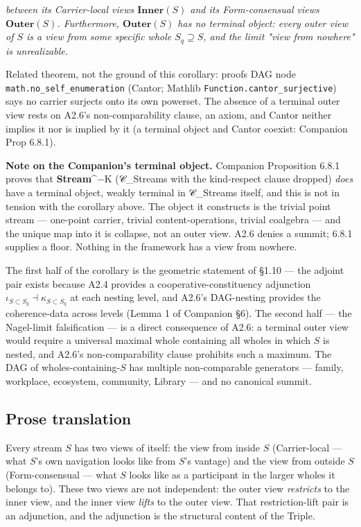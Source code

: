 \documentclass[11pt, openany]{book}
\begin{document}
\textit{between its Carrier-local views $\mathbf{Inner}(S)$ and its Form-consensual views $\mathbf{Outer}(S)$. Furthermore, $\mathbf{Outer}(S)$ has no terminal object: every outer view of $S$ is a view from some specific whole $S_q \supseteq S$, and the limit "view from nowhere" is unrealizable.}

Related theorem, not the ground of this corollary: proofs DAG node \texttt{math.no\_self\_enumeration} (Cantor; Mathlib \texttt{Function.cantor\_surjective}) says no carrier surjects onto its own powerset. The absence of a terminal outer view rests on A2.6's non-comparability clause, an axiom, and Cantor neither implies it nor is implied by it (a terminal object and Cantor coexist: Companion Prop 6.8.1).

\textbf{Note on the Companion's terminal object.} Companion Proposition 6.8.1 proves that \textbf{Stream}\textasciicircum{}{−K} (𝒞\_\allowbreak{}Streams with the kind-respect clause dropped) \textit{does} have a terminal object, weakly terminal in 𝒞\_\allowbreak{}Streams itself, and this is not in tension with the corollary above. The object it constructs is the trivial point stream --- one-point carrier, trivial content-operations, trivial coalgebra --- and the unique map into it is collapse, not an outer view. A2.6 denies a summit; 6.8.1 supplies a floor. Nothing in the framework has a view from nowhere.

The first half of the corollary is the geometric statement of §1.10 --- the adjoint pair exists because A2.4 provides a cooperative-constituency adjunction $\iota_{S \subset S_q} \dashv \kappa_{S \subset S_q}$ at each nesting level, and A2.6's DAG-nesting provides the coherence-data across levels (Lemma 1 of Companion §6). The second half --- the Nagel-limit falsification --- is a direct consequence of A2.6: a terminal outer view would require a universal maximal whole containing all wholes in which $S$ is nested, and A2.6's non-comparability clause prohibits such a maximum. The DAG of wholes-containing-$S$ has multiple non-comparable generators --- family, workplace, ecosystem, community, Library --- and no canonical summit.

\subsection{Prose translation}

Every stream $S$ has two views of itself: the view from inside $S$ (Carrier-local --- what $S$'s own navigation looks like from $S$'s vantage) and the view from outside $S$ (Form-consensual --- what $S$ looks like as a participant in the larger wholes it belongs to). These two views are not independent: the outer view \textit{restricts} to the inner view, and the inner view \textit{lifts} to the outer view. That restriction-lift pair is an adjunction, and the adjunction is the structural content of the Triple.
\end{document}
